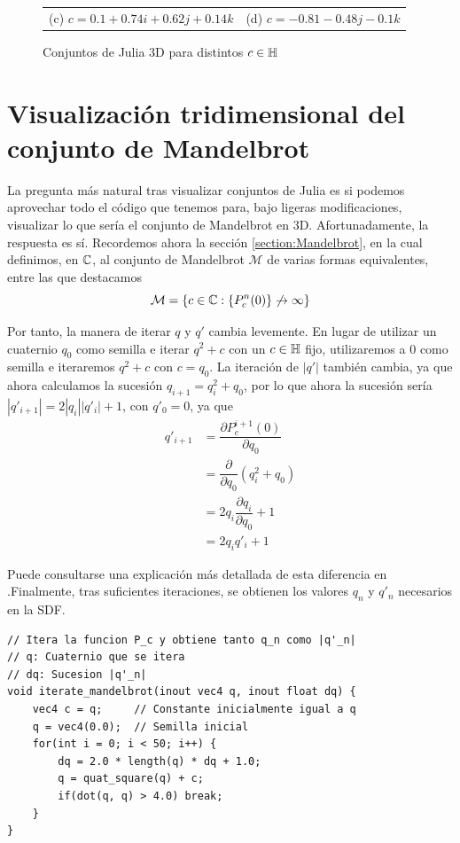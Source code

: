 \begin{figure}[ht]
\begin{tabular}{cc}
    (c) $c=0.1+0.74i+0.62j+0.14k$ & (d) $c=-0.81-0.48j-0.1k$ \\[6pt]
    \end{tabular}
    \caption{Conjuntos de Julia 3D para distintos $c\in\mathbb{H}$}
    \label{fig:julia-3D}
\end{figure}

\section{Visualización tridimensional del conjunto de Mandelbrot}
\label{section:Mandelbrot-3D}

La pregunta más natural tras visualizar conjuntos de Julia es si podemos aprovechar todo el código que tenemos para, bajo ligeras modificaciones, visualizar lo que sería el conjunto de Mandelbrot en 3D. Afortunadamente, la respuesta es sí. Recordemos ahora la sección \ref{section:Mandelbrot}, en la cual definimos, en $\mathbb{C}$, al conjunto de Mandelbrot $\mathcal{M}$ de varias formas equivalentes, entre las que destacamos
$$
\mathcal{M}=\{c\in\mathbb{C} : \{P_c^n(0)\}\not\rightarrow\infty\}
$$

Por tanto, la manera de iterar $q$ y $q'$ cambia levemente. En lugar de utilizar un cuaternio $q_0$ como semilla e iterar $q^2+c$ con un $c\in\mathbb{H}$ fijo, utilizaremos a $0$ como semilla e iteraremos $q^2+c$ con $c=q_0$. La iteración de $|q'|$ también cambia, ya que ahora calculamos la sucesión $q_{i+1}=q_i^2 + q_0$, por lo que ahora la sucesión sería $|q'_{i+1}|=2|q_i||q'_i|+1$, con $q'_0=0$, ya que
\begin{equation}
  \begin{split}
    q'_{i+1} &= \dfrac{\partial P^{i+1}_c(0)}{\partial q_0} \\
    &= \dfrac{\partial}{\partial q_0}\left(q_i^2 + q_0\right) \\
    &= 2 q_i \dfrac{\partial q_i}{\partial q_0} + 1 \\
    &= 2q_i q'_i +1
  \end{split}
\end{equation}

Puede consultarse una explicación más detallada de esta diferencia en \cite{distance-fractals}.Finalmente, tras suficientes iteraciones, se obtienen los valores $q_n$ y $q'_n$ necesarios en la SDF.

\begin{lstlisting}
// Itera la funcion P_c y obtiene tanto q_n como |q'_n|
// q: Cuaternio que se itera
// dq: Sucesion |q'_n|
void iterate_mandelbrot(inout vec4 q, inout float dq) {
    vec4 c = q;     // Constante inicialmente igual a q
    q = vec4(0.0);  // Semilla inicial
    for(int i = 0; i < 50; i++) {
        dq = 2.0 * length(q) * dq + 1.0;
        q = quat_square(q) + c;
        if(dot(q, q) > 4.0) break;
    }
}
\end{lstlisting}

